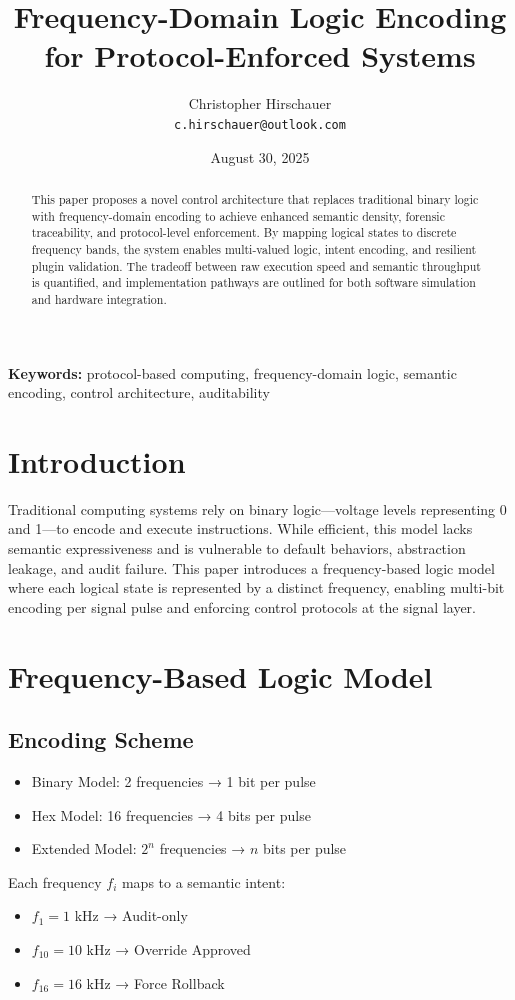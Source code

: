 \documentclass[12pt]{article}
\title{Frequency-Domain Logic Encoding for Protocol-Enforced Systems}
\author{Christopher Hirschauer \\ \texttt{c.hirschauer@outlook.com}}
\date{August 30, 2025}
\begin{document}
\maketitle
\begin{abstract}
This paper proposes a novel control architecture that replaces traditional binary logic with frequency-domain encoding to achieve enhanced semantic density, forensic traceability, and protocol-level enforcement. By mapping logical states to discrete frequency bands, the system enables multi-valued logic, intent encoding, and resilient plugin validation. The tradeoff between raw execution speed and semantic throughput is quantified, and implementation pathways are outlined for both software simulation and hardware integration.
\end{abstract}

\textbf{Keywords:} protocol-based computing, frequency-domain logic, semantic encoding, control architecture, auditability

\section{Introduction}
Traditional computing systems rely on binary logic—voltage levels representing 0 and 1—to encode and execute instructions. While efficient, this model lacks semantic expressiveness and is vulnerable to default behaviors, abstraction leakage, and audit failure. This paper introduces a frequency-based logic model where each logical state is represented by a distinct frequency, enabling multi-bit encoding per signal pulse and enforcing control protocols at the signal layer.

\section{Frequency-Based Logic Model}
\subsection{Encoding Scheme}
\begin{itemize}
  \item Binary Model: 2 frequencies → 1 bit per pulse
  \item Hex Model: 16 frequencies → 4 bits per pulse
  \item Extended Model: $2^n$ frequencies → $n$ bits per pulse
\end{itemize}
Each frequency $f_i$ maps to a semantic intent:
\begin{itemize}
  \item $f_1 = 1$ kHz → Audit-only
  \item $f_{10} = 10$ kHz → Override Approved
  \item $f_{16} = 16$ kHz → Force Rollback
\end{itemize}
\end{document}
